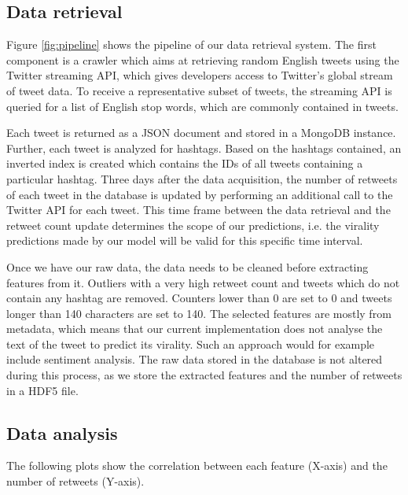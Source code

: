 \subsection{Data retrieval}
Figure \ref{fig:pipeline} shows the pipeline of our data retrieval system. The first component is a crawler which aims at retrieving random English tweets using the Twitter streaming API, which gives developers access to Twitter’s global stream of tweet data. To receive a representative subset of tweets, the streaming API is queried for a list of English stop words, which are commonly contained in tweets.

Each tweet is returned as a JSON document and stored in a MongoDB instance. Further, each tweet is analyzed for hashtags. Based on the hashtags contained, an inverted index is created which contains the IDs of all tweets containing a particular hashtag. Three days after the data acquisition, the number of retweets of each tweet in the database is updated by performing an additional call to the Twitter API for each tweet. This time frame between the data retrieval and the retweet count update determines the scope of our predictions, i.e. the virality predictions made by our model will be valid for this specific time interval.

Once we have our raw data, the data needs to be cleaned before extracting features from it. Outliers with a very high retweet count and tweets which do not contain any hashtag are removed. Counters lower than 0 are set to 0 and tweets longer than 140 characters are set to 140. The selected features are mostly from metadata, which means that our current implementation does not analyse the text of the tweet to predict its virality. Such an approach would for example include sentiment analysis. The raw data stored in the database is not altered during this process, as we store the extracted features and the number of retweets in a HDF5 file.

\subsection{Data analysis}
\label{sec:analyis}
The following plots show the correlation between each feature (X-axis) and the number of retweets (Y-axis).


